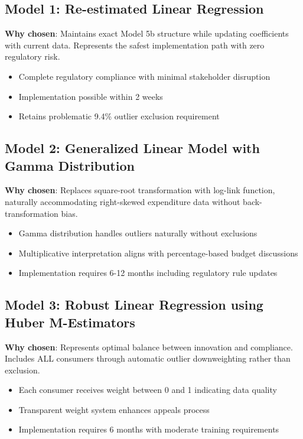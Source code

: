 \subsection{Model 1: Re-estimated Linear Regression}
\textbf{Why chosen}: Maintains exact Model 5b structure while updating coefficients with current data. Represents the safest implementation path with zero regulatory risk.
\begin{itemize}
    \item Complete regulatory compliance with minimal stakeholder disruption
    \item Implementation possible within 2 weeks
    \item Retains problematic 9.4\% outlier exclusion requirement
\end{itemize}

\subsection{Model 2: Generalized Linear Model with Gamma Distribution}
\textbf{Why chosen}: Replaces square-root transformation with log-link function, naturally accommodating right-skewed expenditure data without back-transformation bias.
\begin{itemize}
    \item Gamma distribution handles outliers naturally without exclusions
    \item Multiplicative interpretation aligns with percentage-based budget discussions
    \item Implementation requires 6-12 months including regulatory rule updates
\end{itemize}

\subsection{Model 3: Robust Linear Regression using Huber M-Estimators}
\textbf{Why chosen}: Represents optimal balance between innovation and compliance. Includes ALL consumers through automatic outlier downweighting rather than exclusion.
\begin{itemize}
    \item Each consumer receives weight between 0 and 1 indicating data quality
    \item Transparent weight system enhances appeals process
    \item Implementation requires 6 months with moderate training requirements
\end{itemize}

